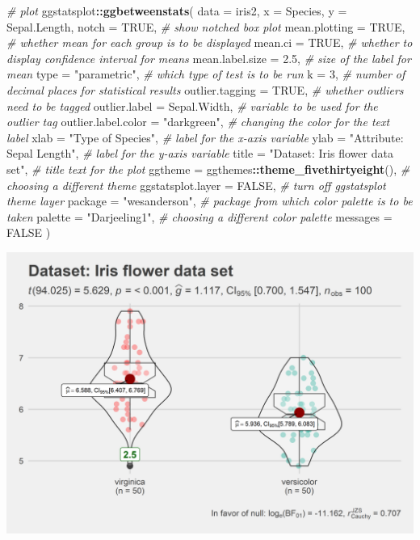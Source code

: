\documentclass[
]{article}
\newenvironment{Shaded}{\begin{snugshade}}{\end{snugshade}}
\newcommand{\CommentTok}[1]{\textcolor[rgb]{0.56,0.35,0.01}{\textit{#1}}}
\newcommand{\DataTypeTok}[1]{\textcolor[rgb]{0.13,0.29,0.53}{#1}}
\newcommand{\DecValTok}[1]{\textcolor[rgb]{0.00,0.00,0.81}{#1}}
\newcommand{\FloatTok}[1]{\textcolor[rgb]{0.00,0.00,0.81}{#1}}
\newcommand{\KeywordTok}[1]{\textcolor[rgb]{0.13,0.29,0.53}{\textbf{#1}}}
\newcommand{\NormalTok}[1]{#1}
\newcommand{\OperatorTok}[1]{\textcolor[rgb]{0.81,0.36,0.00}{\textbf{#1}}}
\newcommand{\OtherTok}[1]{\textcolor[rgb]{0.56,0.35,0.01}{#1}}
\newcommand{\StringTok}[1]{\textcolor[rgb]{0.31,0.60,0.02}{#1}}
\begin{document}
\begin{Shaded}
\begin{Highlighting}[]
\CommentTok{\# plot}
\NormalTok{ggstatsplot}\OperatorTok{::}\KeywordTok{ggbetweenstats}\NormalTok{(}
  \DataTypeTok{data =}\NormalTok{ iris2,}
  \DataTypeTok{x =}\NormalTok{ Species,}
  \DataTypeTok{y =}\NormalTok{ Sepal.Length,}
  \DataTypeTok{notch =} \OtherTok{TRUE}\NormalTok{, }\CommentTok{\# show notched box plot}
  \DataTypeTok{mean.plotting =} \OtherTok{TRUE}\NormalTok{, }\CommentTok{\# whether mean for each group is to be displayed}
  \DataTypeTok{mean.ci =} \OtherTok{TRUE}\NormalTok{, }\CommentTok{\# whether to display confidence interval for means}
  \DataTypeTok{mean.label.size =} \FloatTok{2.5}\NormalTok{, }\CommentTok{\# size of the label for mean}
  \DataTypeTok{type =} \StringTok{"parametric"}\NormalTok{, }\CommentTok{\# which type of test is to be run}
  \DataTypeTok{k =} \DecValTok{3}\NormalTok{, }\CommentTok{\# number of decimal places for statistical results}
  \DataTypeTok{outlier.tagging =} \OtherTok{TRUE}\NormalTok{, }\CommentTok{\# whether outliers need to be tagged}
  \DataTypeTok{outlier.label =}\NormalTok{ Sepal.Width, }\CommentTok{\# variable to be used for the outlier tag}
  \DataTypeTok{outlier.label.color =} \StringTok{"darkgreen"}\NormalTok{, }\CommentTok{\# changing the color for the text label}
  \DataTypeTok{xlab =} \StringTok{"Type of Species"}\NormalTok{, }\CommentTok{\# label for the x{-}axis variable}
  \DataTypeTok{ylab =} \StringTok{"Attribute: Sepal Length"}\NormalTok{, }\CommentTok{\# label for the y{-}axis variable}
  \DataTypeTok{title =} \StringTok{"Dataset: Iris flower data set"}\NormalTok{, }\CommentTok{\# title text for the plot}
  \DataTypeTok{ggtheme =}\NormalTok{ ggthemes}\OperatorTok{::}\KeywordTok{theme\_fivethirtyeight}\NormalTok{(), }\CommentTok{\# choosing a different theme}
  \DataTypeTok{ggstatsplot.layer =} \OtherTok{FALSE}\NormalTok{, }\CommentTok{\# turn off ggstatsplot theme layer}
  \DataTypeTok{package =} \StringTok{"wesanderson"}\NormalTok{, }\CommentTok{\# package from which color palette is to be taken}
  \DataTypeTok{palette =} \StringTok{"Darjeeling1"}\NormalTok{, }\CommentTok{\# choosing a different color palette}
  \DataTypeTok{messages =} \OtherTok{FALSE}
\NormalTok{)}
\end{Highlighting}
\end{Shaded}

\includegraphics[width=1\linewidth]{./figures/paper-ggbetweenstats2-1}
\end{document}

